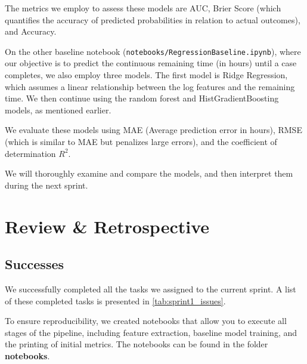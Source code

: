\documentclass[runningheads]{llncs}
\begin{document}
The metrics we employ to assess these models are AUC, Brier Score (which quantifies the accuracy of predicted probabilities in relation to actual outcomes), and Accuracy.

On the other baseline notebook (\texttt{notebooks/RegressionBaseline.ipynb}), where our objective is to predict the continuous remaining time (in hours) until a case completes, we also employ three models. The first model is Ridge Regression, which assumes a linear relationship between the log features and the remaining time. We then continue using the random forest and HistGradientBoosting models, as mentioned earlier.

We evaluate these models using MAE (Average prediction error in hours), RMSE (which is similar to MAE but penalizes large errors), and the coefficient of determination $R^2$.

We will thoroughly examine and compare the models, and then interpret them during the next sprint.


\section{Review \& Retrospective}

\subsection{Successes}

We successfully completed all the tasks we assigned to the current sprint. A list of these completed tasks is presented in \autoref{tab:sprint1_issues}.

To ensure reproducibility, we created notebooks that allow you to execute all stages of the pipeline, including feature extraction, baseline model training, and the printing of initial metrics. The notebooks can be found in the folder \textbf{notebooks}.
\end{document}
